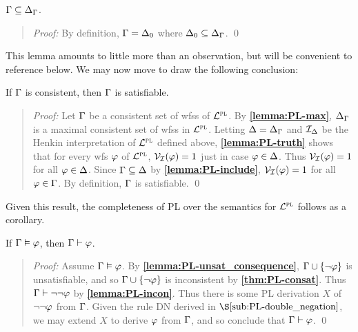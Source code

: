 \begin{Lthm} \label{lemma:PL-include}
  $\Gamma\subseteq\Delta_{\Gamma}$.
\end{Lthm} \vspace{-.2in}
 
\begin{quote} 
  \textit{Proof:} 
  By definition, $\Gamma=\Delta_0$ where $\Delta_0\subseteq\Delta_{\Gamma}$.
  \qed
\end{quote}

This lemma amounts to little more than an observation, but will be convenient to reference below.
We may now move to draw the following conclusion:

\begin{Tthm} \label{thm:PL-consat}
  If $\Gamma$ is consistent, then $\Gamma$ is satisfiable. 
\end{Tthm} \vspace{-.2in}

\begin{quote} 
  \textit{Proof:} 
  Let $\Gamma$ be a consistent set of wfss of $\mathcal{L}^{\textsc{pl}}$.
  By \textbf{\ref{lemma:PL-max}}, $\Delta_{\Gamma}$ is a maximal consistent set of wfss in $\mathcal{L}^{\textsc{pl}}$.
  Letting $\Delta=\Delta_{\Gamma}$ and $\mathcal{I}_{\Delta}$ be the Henkin interpretation of $\mathcal{L}^{\textsc{pl}}$ defined above, \textbf{\ref{lemma:PL-truth}} shows that for every wfs $\varphi$ of $\mathcal{L}^{\textsc{pl}}$, $\mathcal{V}_{\mathcal{I}}(\varphi) = 1$ just in case $\varphi \in \Delta$.
  Thus $\mathcal{V}_{\mathcal{I}}(\varphi) = 1$ for all $\varphi \in \Delta$.
  Since $\Gamma \subseteq \Delta$ by \textbf{\ref{lemma:PL-include}}, $\mathcal{V}_{\mathcal{I}}(\varphi) = 1$ for all $\varphi \in \Gamma$.
  By definition, $\Gamma$ is satisfiable.
  \qed
\end{quote}

Given this result, the completeness of PL over the semantics for $\mathcal{L}^{\textsc{pl}}$ follows as a corollary. 

\begin{Cthm}[Completeness] \label{cor:Completeness}
  If $\Gamma\vDash\varphi$, then $\Gamma\vdash\varphi$.
\end{Cthm} \vspace{-.2in}

\begin{quote} 
  \textit{Proof:}
  Assume $\Gamma\vDash\varphi$. 
  By \textbf{\ref{lemma:PL-unsat_consequence}}, $\Gamma \cup \lbrace\neg \varphi\rbrace$ is unsatisfiable, and so $\Gamma \cup \lbrace\neg \varphi\rbrace$ is inconsistent by \textbf{\ref{thm:PL-consat}}. 
  Thus $\Gamma \vdash \neg \neg \varphi$ by \textbf{\ref{lemma:PL-incon}}.
  Thus there is some PL derivation $X$ of $\neg \neg \varphi$ from $\Gamma$. 
  Given the rule DN derived in $\S\ref{sub:PL-double_negation}$, we may extend $X$ to derive $\varphi$ from $\Gamma$, and so conclude that $\Gamma \vdash \varphi$. 
  \qed
\end{quote}

